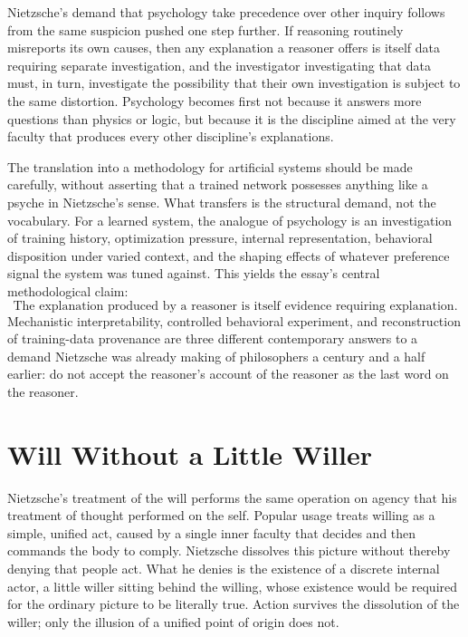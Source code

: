 \documentclass[11pt]{article}
\begin{document}
Nietzsche's demand that psychology take precedence over other inquiry \cite[\S 23]{nietzsche1886} follows from the same suspicion pushed one step further. If reasoning routinely misreports its own causes, then any explanation a reasoner offers is itself data requiring separate investigation, and the investigator investigating that data must, in turn, investigate the possibility that their own investigation is subject to the same distortion. Psychology becomes first not because it answers more questions than physics or logic, but because it is the discipline aimed at the very faculty that produces every other discipline's explanations.

The translation into a methodology for artificial systems should be made carefully, without asserting that a trained network possesses anything like a psyche in Nietzsche's sense. What transfers is the structural demand, not the vocabulary. For a learned system, the analogue of psychology is an investigation of training history, optimization pressure, internal representation, behavioral disposition under varied context, and the shaping effects of whatever preference signal the system was tuned against. This yields the essay's central methodological claim:
\[
\boxed{\text{The explanation produced by a reasoner is itself evidence requiring explanation.}}
\]
Mechanistic interpretability, controlled behavioral experiment, and reconstruction of training-data provenance are three different contemporary answers to a demand Nietzsche was already making of philosophers a century and a half earlier: do not accept the reasoner's account of the reasoner as the last word on the reasoner.

\section{Will Without a Little Willer}

Nietzsche's treatment of the will performs the same operation on agency that his treatment of thought performed on the self. Popular usage treats willing as a simple, unified act, caused by a single inner faculty that decides and then commands the body to comply. Nietzsche dissolves this picture without thereby denying that people act. What he denies is the existence of a discrete internal actor, a little willer sitting behind the willing, whose existence would be required for the ordinary picture to be literally true. Action survives the dissolution of the willer; only the illusion of a unified point of origin does not.
\end{document}
